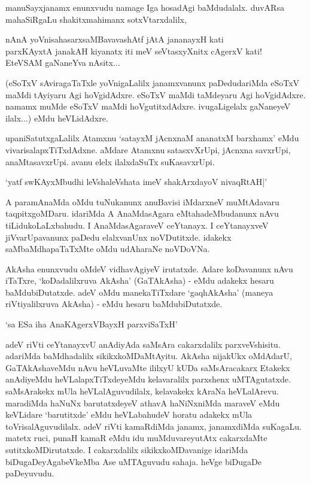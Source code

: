 manuSayxjanamx enunxvudu namage Iga hosadAgi baMdudalalx. duvARsa mahaSiRgaLu shakitxmahimanx sotxVtarxdalilx,

\begin{shloka}
nAnA yoVnisahasarxsaMBavavashAtf jAtA jananayxH kati\\
parxKAyxtA janakAH kiyanatx iti meV seVtasxyXnitx cAgerxV kati!\\
EteVSAM gaNaneYva nAsitx$\ldots$ 
\end{shloka}

(eSoTxV sAviragaTaTxle yoVnigaLalilx janamxvanunx paDedudariMda eSoTxV maMdi tAyiyaru Agi hoVgidAdxre. eSoTxV maMdi taMdeyaru Agi hoVgidAdxre. namamx muMde eSoTxV maMdi hoVgutitxdAdxre. ivugaLigelalx gaNaneyeV ilalx$\ldots$) eMdu heVLidAdxre.

upaniSatutxgaLalilx Atamxnu `satayxM jAcnxnaM ananatxM barxhamx' eMdu vivarisalapxTiTxdAdxne. aMdare Atamxnu satasxvXrUpi, jAcnxna savxrUpi, anaMtasavxrUpi. avanu elelx ilalxdaSuTx suKasavxrUpi.

\begin{shloka}
`yatf swKAyxMbudhi leVshaleVshata imeV shakArxdayoV nivaqRtAH|'
\end{shloka}

A paramAnaMda oMdu tuNukanunx anuBavisi iMdarxneV muMtAdavaru taqpitxgoMDaru. idariMda A AnaMdasAgara eMtahadeMbudanunx nAvu tiLidukoLaLxbahudu. I AnaMdasAgaraveV ceYtanayx. I ceYtanayxveV jiVvarUpavanunx paDedu elalxvanUnx noVDutitxde. idakekx saMbaMdhapaTaTxMte oMdu udAharaNe noVDoVNa.

AkAsha enunxvudu oMdeV vidhavAgiyeV irutatxde. Adare koDavanunx nAvu iTaTxre, `koDadalilxruva AkAsha' (GaTAkAsha) - eMdu adakekx hesaru baMdubiDutatxde. adeV oMdu manekaTiTxdare `gaqhAkAsha' (maneya riVtiyalilxruva AkAsha) - eMdu hesaru baMdubiDutatxde.

\begin{shloka}
`sa ESa iha AnaKAgerxVBayxH parxviSaTxH'
\end{shloka}

adeV riVti ceYtanayxvU anAdiyAda saMsAra cakarxdalilx parxveVshisitu. adariMda baMdhadalilx sikikxkoMDaMtAyitu. AkAsha nijakUkx oMdAdarU, GaTAkAshaveMdu nAvu heVLuvaMte ililxyU kUDa saMsAracakarx Etakekx anAdiyeMdu heVLalapxTiTxdeyeMdu kelavaralilx parxshenx uMTAgutatxde. saMsArakekx mUla heVLalAguvudilalx, kelavakekx kAraNa heVLalArevu. maradiMda haNuNx barutatxdeyeV athavA haNiNxniMda maraveV eMdu keVLidare `barutitxde' eMdu heVLabahudeV horatu adakekx mUla toVrisalAguvudilalx. adeV riVti kamaRdiMda janamx, janamxdiMda suKagaLu. matetx ruci, punaH kamaR eMdu idu muMduvareyutAtx cakarxdaMte sutitxkoMDirutatxde. I cakarxdalilx sikikxkoMDavanige idariMda biDugaDeyAgabeVkeMba Ase uMTAguvudu sahaja. heVge biDugaDe paDeyuvudu.

